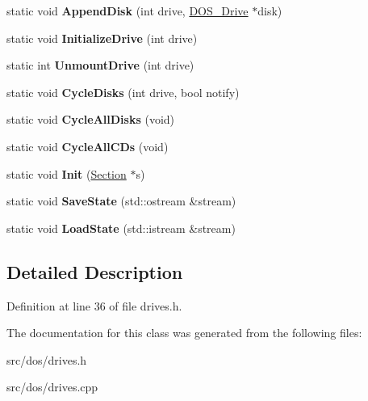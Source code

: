 \begin{DoxyCompactItemize}
\item 
\hypertarget{classDriveManager_a54920d4970b96e29957472859ad4bead}{static void {\bfseries Append\-Disk} (int drive, \hyperlink{classDOS__Drive}{D\-O\-S\-\_\-\-Drive} $\ast$disk)}\label{classDriveManager_a54920d4970b96e29957472859ad4bead}

\item 
\hypertarget{classDriveManager_a1d0f6529b0092f7b7a466743cbd2f99f}{static void {\bfseries Initialize\-Drive} (int drive)}\label{classDriveManager_a1d0f6529b0092f7b7a466743cbd2f99f}

\item 
\hypertarget{classDriveManager_af6bdeda1b4db20820d7b62a30b6e1b10}{static int {\bfseries Unmount\-Drive} (int drive)}\label{classDriveManager_af6bdeda1b4db20820d7b62a30b6e1b10}

\item 
\hypertarget{classDriveManager_a78a43ccb050064485d7a5ca7434b7e86}{static void {\bfseries Cycle\-Disks} (int drive, bool notify)}\label{classDriveManager_a78a43ccb050064485d7a5ca7434b7e86}

\item 
\hypertarget{classDriveManager_a8d9b7ba9258ddf571eaa1c5bf6c6dfc8}{static void {\bfseries Cycle\-All\-Disks} (void)}\label{classDriveManager_a8d9b7ba9258ddf571eaa1c5bf6c6dfc8}

\item 
\hypertarget{classDriveManager_a4fdec5341d5d213604abdc4d138ea93c}{static void {\bfseries Cycle\-All\-C\-Ds} (void)}\label{classDriveManager_a4fdec5341d5d213604abdc4d138ea93c}

\item 
\hypertarget{classDriveManager_a753a8663f424be58db0242d48f474ce2}{static void {\bfseries Init} (\hyperlink{classSection}{Section} $\ast$s)}\label{classDriveManager_a753a8663f424be58db0242d48f474ce2}

\item 
\hypertarget{classDriveManager_ac5d9fd45c60da68aecdba59b04af222c}{static void {\bfseries Save\-State} (std\-::ostream \&stream)}\label{classDriveManager_ac5d9fd45c60da68aecdba59b04af222c}

\item 
\hypertarget{classDriveManager_ac4e28941259a013f9d04fecd2198fd52}{static void {\bfseries Load\-State} (std\-::istream \&stream)}\label{classDriveManager_ac4e28941259a013f9d04fecd2198fd52}

\end{DoxyCompactItemize}


\subsection{Detailed Description}


Definition at line 36 of file drives.\-h.



The documentation for this class was generated from the following files\-:\begin{DoxyCompactItemize}
\item 
src/dos/drives.\-h\item 
src/dos/drives.\-cpp\end{DoxyCompactItemize}
